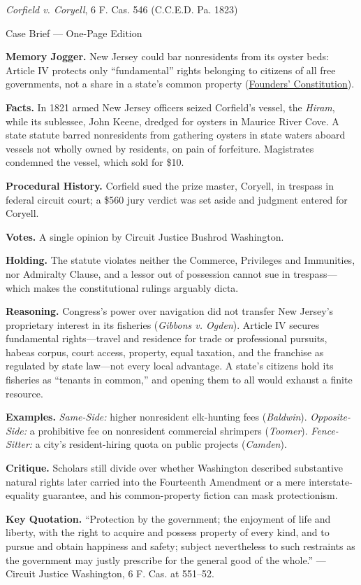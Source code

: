 \documentclass[12pt]{article}
\begin{document}
\begin{center}
{\Large \textit{Corfield v. Coryell}, 6 F. Cas. 546 (C.C.E.D. Pa. 1823)\par}
\vspace{0.3em}
{\normalsize Case Brief --- One-Page Edition\par}
\end{center}

\textbf{Memory Jogger.} New Jersey could bar nonresidents from its oyster beds: Article IV protects only ``fundamental'' rights belonging to citizens of all free governments, not a share in a state's common property (\href{https://press-pubs.uchicago.edu/founders/documents/a4_2_1s18.html}{Founders' Constitution}).

\textbf{Facts.} In 1821 armed New Jersey officers seized Corfield's vessel, the \textit{Hiram}, while its sublessee, John Keene, dredged for oysters in Maurice River Cove. A state statute barred nonresidents from gathering oysters in state waters aboard vessels not wholly owned by residents, on pain of forfeiture. Magistrates condemned the vessel, which sold for \$10.

\textbf{Procedural History.} Corfield sued the prize master, Coryell, in trespass in federal circuit court; a \$560 jury verdict was set aside and judgment entered for Coryell.

\textbf{Votes.} A single opinion by Circuit Justice Bushrod Washington.

\textbf{Holding.} The statute violates neither the Commerce, Privileges and Immunities, nor Admiralty Clause, and a lessor out of possession cannot sue in trespass---which makes the constitutional rulings arguably dicta.

\textbf{Reasoning.} Congress's power over navigation did not transfer New Jersey's proprietary interest in its fisheries (\textit{Gibbons v. Ogden}). Article IV secures fundamental rights---travel and residence for trade or professional pursuits, habeas corpus, court access, property, equal taxation, and the franchise as regulated by state law---not every local advantage. A state's citizens hold its fisheries as ``tenants in common,'' and opening them to all would exhaust a finite resource.

\textbf{Examples.} \emph{Same-Side:} higher nonresident elk-hunting fees (\textit{Baldwin}). \emph{Opposite-Side:} a prohibitive fee on nonresident commercial shrimpers (\textit{Toomer}). \emph{Fence-Sitter:} a city's resident-hiring quota on public projects (\textit{Camden}).

\textbf{Critique.} Scholars still divide over whether Washington described substantive natural rights later carried into the Fourteenth Amendment or a mere interstate-equality guarantee, and his common-property fiction can mask protectionism.

\textbf{Key Quotation.} ``Protection by the government; the enjoyment of life and liberty, with the right to acquire and possess property of every kind, and to pursue and obtain happiness and safety; subject nevertheless to such restraints as the government may justly prescribe for the general good of the whole.'' --- Circuit Justice Washington, 6 F. Cas. at 551--52.
\end{document}
